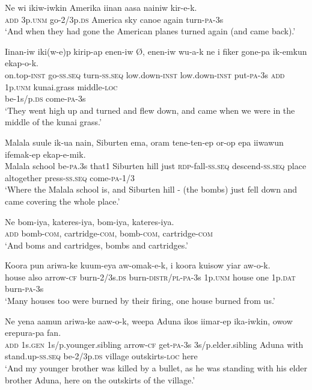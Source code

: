\ea
\gll  Ne  wi  ikiw-iwkin  Amerika  iinan  aasa  nainiw  kir-e-k. \\
\textsc{add}  3p.\textsc{unm}  go-2/3p.\textsc{ds}  America  sky  canoe  again  turn-\textsc{pa}-3s \\
\glt ‘And when they had gone the American planes turned again (and came back).’ \\
\z


\ea
\gll  Iinan-iw  iki(w-e)p  kirip-ap  enen-iw  Ø, enen-iw  wu-a-k  ne  i  fiker  gone-pa  ik-emkun  ekap-o-k. \\
on.top-\textsc{inst}  go-\textsc{ss.seq}  turn-\textsc{ss.seq}  low.down-\textsc{inst}   low.down-\textsc{inst}  put-\textsc{pa}-3s  \textsc{add}  1p.\textsc{unm}  kunai.grass  middle-\textsc{loc} \\
be-1s/p.\textsc{ds}  come-\textsc{pa}-3s \\
\glt ‘They went high up and turned and flew down, and came when we were in the middle of the kunai grass.’ \\
\z


\ea
\gll  Malala  suule  ik-ua  nain,  Siburten  ema,  oram  tene-ten-ep  or-op  epa  iiwawun  ifemak-ep  ekap-e-mik. \\
Malala  school  be-\textsc{pa}.3s  that1  Siburten  hill  just  \textsc{rdp}-fall-\textsc{ss.seq} descend-\textsc{ss.seq}  place  altogether  press-\textsc{ss.seq}  come-\textsc{pa}-1/3 \\
\glt ‘Where the Malala school is, and Siburten hill - (the bombs) just fell down and came covering the whole place.’ \\
\z


\ea
\gll  Ne  bom-iya,  kateres-iya,  bom-iya,  kateres-iya. \\
\textsc{add}  bomb-\textsc{com},  cartridge-\textsc{com},  bomb-\textsc{com},  cartridge-\textsc{com} \\
\glt ‘And boms and cartridges, bombs and cartridges.’ \\
\z


\ea
\gll  Koora  pun  ariwa-ke  kuum-eya  aw-omak-e-k,  i  koora  kuisow  yiar  aw-o-k. \\
house  also  arrow-\textsc{cf}  burn-2/3s.\textsc{ds}  burn-\textsc{distr}/\textsc{pl}-\textsc{pa}-3s 1p.\textsc{unm}  house  one  1p.\textsc{dat}  burn-\textsc{pa}-3s \\
\glt ‘Many houses too were burned by their firing, one house burned from us.’ \\
\z


\ea
\gll  Ne  yena  aamun  ariwa-ke  aaw-o-k, weepa  Aduna  ikos  iimar-ep  ika-iwkin,  owow  erepura-pa  fan. \\
\textsc{add}  1s.\textsc{gen}  1s/p.younger.sibling  arrow-\textsc{cf}  get-\textsc{pa}-3s 3s/p.elder.sibling  Aduna  with  stand.up-\textsc{ss.seq}  be-2/3p.\textsc{ds} village  outskirts-\textsc{loc}  here \\
\glt ‘And my younger brother was killed by a bullet, as he was standing with his elder brother Aduna, here on the outskirts of the village.’ \\
\z


